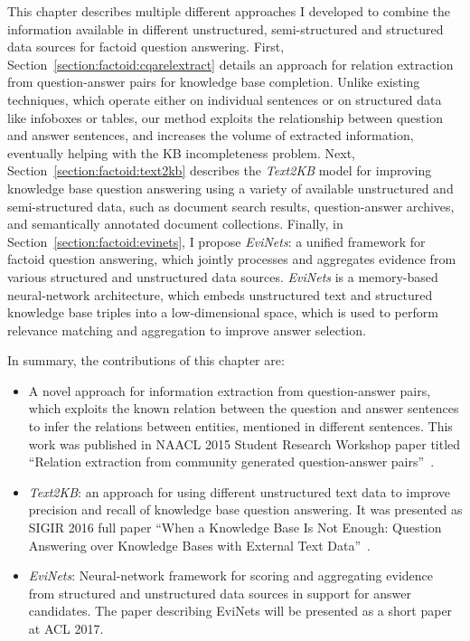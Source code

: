 This chapter describes multiple different approaches I developed to combine the information available in different unstructured, semi-structured and structured data sources for factoid question answering.
First, Section~\ref{section:factoid:cqarelextract} details an approach for relation extraction from question-answer pairs for knowledge base completion.
Unlike existing techniques, which operate either on individual sentences or on structured data like infoboxes or tables, our method exploits the relationship between question and answer sentences, and increases the volume of extracted information, eventually helping with the KB incompleteness problem.
Next, Section~\ref{section:factoid:text2kb} describes the \textit{Text2KB} model for improving knowledge base question answering using a variety of available unstructured and semi-structured data, such as document search results, question-answer archives, and semantically annotated document collections.
Finally, in Section~\ref{section:factoid:evinets}, I propose \textit{EviNets}: a unified framework for factoid question answering, which jointly processes and aggregates evidence from various structured and unstructured data sources.
\textit{EviNets} is a memory-based neural-network architecture, which embeds unstructured text and structured knowledge base triples into a low-dimensional space, which is used to perform relevance matching and aggregation to improve answer selection.

In summary, the contributions of this chapter are:
\begin{itemize}
\item A novel approach for information extraction from question-answer pairs, which exploits the known relation between the question and answer sentences to infer the relations between entities, mentioned in different sentences.
This work was published in NAACL 2015 Student Research Workshop paper titled ``Relation extraction from community generated question-answer pairs''~\cite{savenkov2015relation}.
\item \textit{Text2KB}: an approach for using different unstructured text data to improve precision and recall of knowledge base question answering.
It was presented as SIGIR 2016 full paper ``When a Knowledge Base Is Not Enough: Question Answering over Knowledge Bases with External Text Data''~\cite{Savenkov:2016:KBE:2911451.2911536}.
\item \textit{EviNets}: Neural-network framework for scoring and aggregating evidence from structured and unstructured data sources in support for answer candidates.
The paper describing EviNets will be presented as a short paper at ACL 2017.
\end{itemize}


